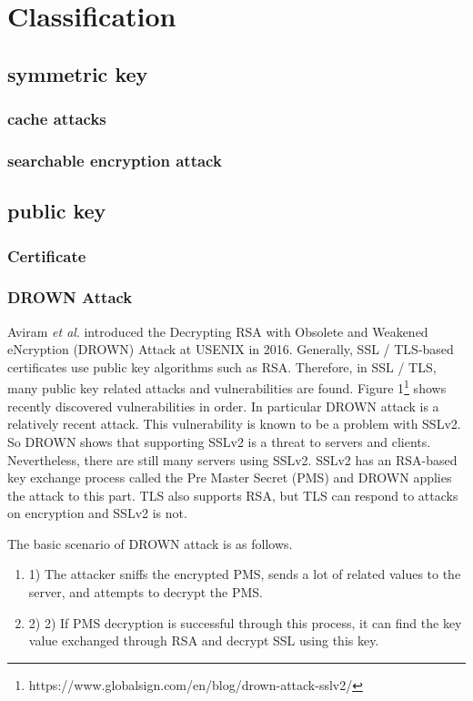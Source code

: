 \documentclass[a4paper]{article}
\begin{document}
\section{Classification}



\subsection{symmetric key}
\subsubsection{cache attacks}
\subsubsection{searchable encryption attack}




\subsection{public key}
\subsubsection{Certificate}
\subsubsection*{DROWN Attack}
Aviram \textit{et al}.\cite{drown} introduced the Decrypting RSA with Obsolete and Weakened eNcryption (DROWN)  Attack at USENIX in 2016. Generally, SSL / TLS-based certificates use public key algorithms such as RSA. Therefore, in SSL / TLS, many public key related attacks and vulnerabilities are found. Figure 1\footnote{https://www.globalsign.com/en/blog/drown-attack-sslv2/} shows recently discovered vulnerabilities in order. In particular DROWN attack is a relatively recent attack. This vulnerability is known to be a problem with SSLv2. So DROWN shows that supporting SSLv2 is a threat to servers and clients. Nevertheless, there are still many servers using SSLv2. SSLv2 has an RSA-based key exchange process called the Pre Master Secret (PMS) and DROWN applies the attack to this part. TLS also supports RSA, but TLS can respond to attacks on encryption and SSLv2 is not.

The basic scenario of DROWN attack is as follows. 
\begin{enumerate}[label=]
      \item 1) The attacker sniffs the encrypted PMS, sends a lot of related values to the server, and attempts to decrypt the PMS.
      
      \item 2) 2) If PMS decryption is successful through this process, it can find the key value exchanged through RSA and decrypt SSL using this key.
\end{enumerate}  
\end{document}
